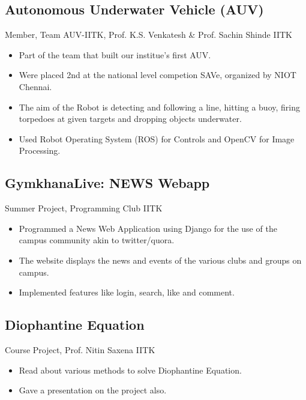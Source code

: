 \documentclass{article}
\begin{document}
    \subsection*{Autonomous Underwater Vehicle (AUV)}
    {Member, Team AUV-IITK, Prof. K.S. Venkatesh \& Prof. Sachin Shinde \hfill IITK}
    \begin{itemize}
        \itemsep0em
        \item {Part of the team that built our institue's first AUV. }
        \item {Were placed 2nd at the national level competion SAVe, organized by NIOT Chennai.}
        \item {The aim of the Robot is detecting and following a line, hitting a buoy, firing torpedoes at given targets and dropping objects underwater.}
        \item {Used Robot Operating System (ROS) for Controls and OpenCV for Image Processing.} 
    \end{itemize}
    
    \subsection*{GymkhanaLive: NEWS Webapp}
    {Summer Project, Programming Club \hfill IITK}
    \begin{itemize}
        \itemsep0em
        \item Programmed a News Web Application using Django for the use of the campus community akin to twitter/quora.
    	\item The website displays the news and events of the various clubs and groups on campus.
    	\item Implemented features like login, search, like and comment.
    \end{itemize}
    
    \subsection*{Diophantine Equation}
    {Course Project, Prof. Nitin Saxena \hfill IITK}
    \begin{itemize} 
        \itemsep0em
        \item Read about various methods to solve Diophantine Equation.
        \item Gave a presentation on the project also.
    \end{itemize}
    
\end{document}

